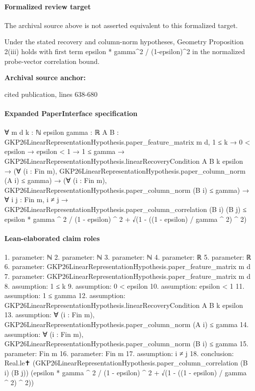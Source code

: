 \documentclass[10pt]{article}
\begin{document}
\paragraph{Formalized review target}
The archival source above is not asserted equivalent to this formalized target.
\begin{ReviewVerbatim}
Under the stated recovery and column-norm hypotheses, Geometry Proposition 2(iii) holds with first term epsilon * gamma^2 / (1-epsilon)^2 in the normalized probe-vector correlation bound.
\end{ReviewVerbatim}

\textbf{Archival source anchor:} {\footnotesize\raggedright cited publication, lines 638-\allowbreak{}680\par}
\paragraph{Expanded PaperInterface specification}
\begin{ReviewVerbatim}
∀ {m d k : ℕ} {epsilon gamma : ℝ} {A B : GKP26LinearRepresentationHypothesis.paper_feature_matrix m d},
  1 ≤ k →
    0 < epsilon →
      epsilon < 1 →
        1 ≤ gamma →
          GKP26LinearRepresentationHypothesis.linearRecoveryCondition A B k epsilon →
            (∀ (i : Fin m), GKP26LinearRepresentationHypothesis.paper_column_norm (A i) ≤ gamma) →
              (∀ (i : Fin m), GKP26LinearRepresentationHypothesis.paper_column_norm (B i) ≤ gamma) →
                ∀ {i j : Fin m},
                  i ≠ j →
                    GKP26LinearRepresentationHypothesis.paper_column_correlation (B i) (B j) ≤
                      epsilon * gamma ^ 2 / (1 - epsilon) ^ 2 + √(1 - ((1 - epsilon) / gamma ^ 2) ^ 2)
\end{ReviewVerbatim}

\paragraph{Lean-elaborated claim roles}\begin{ReviewVerbatim}
1. parameter: ℕ
2. parameter: ℕ
3. parameter: ℕ
4. parameter: ℝ
5. parameter: ℝ
6. parameter: GKP26LinearRepresentationHypothesis.paper_feature_matrix m d
7. parameter: GKP26LinearRepresentationHypothesis.paper_feature_matrix m d
8. assumption: 1 ≤ k
9. assumption: 0 < epsilon
10. assumption: epsilon < 1
11. assumption: 1 ≤ gamma
12. assumption: GKP26LinearRepresentationHypothesis.linearRecoveryCondition A B k epsilon
13. assumption: ∀ (i : Fin m), GKP26LinearRepresentationHypothesis.paper_column_norm (A i) ≤ gamma
14. assumption: ∀ (i : Fin m), GKP26LinearRepresentationHypothesis.paper_column_norm (B i) ≤ gamma
15. parameter: Fin m
16. parameter: Fin m
17. assumption: i ≠ j
18. conclusion: Real.le✝ (GKP26LinearRepresentationHypothesis.paper_column_correlation (B i) (B j))
  (epsilon * gamma ^ 2 / (1 - epsilon) ^ 2 + √(1 - ((1 - epsilon) / gamma ^ 2) ^ 2))
\end{ReviewVerbatim}
\end{document}
